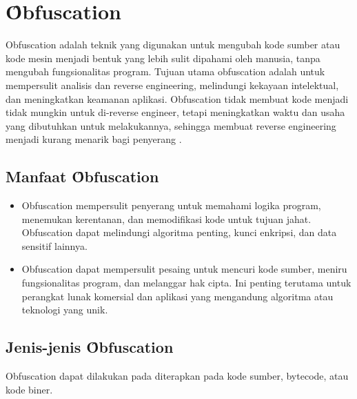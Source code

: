 \section{\f{Obfuscation}}
Obfuscation adalah teknik yang digunakan untuk mengubah kode sumber atau kode mesin menjadi bentuk yang lebih sulit dipahami oleh manusia, tanpa mengubah fungsionalitas program. Tujuan utama obfuscation adalah untuk mempersulit analisis dan reverse engineering, melindungi kekayaan intelektual, dan meningkatkan keamanan aplikasi. Obfuscation tidak membuat kode menjadi tidak mungkin untuk di-reverse engineer, tetapi meningkatkan waktu dan usaha yang dibutuhkan untuk melakukannya, sehingga membuat reverse engineering menjadi kurang menarik bagi penyerang \cite{Jin24}.

\subsection{Manfaat \f{Obfuscation}}
\begin{itemize}
	\item {} Obfuscation mempersulit penyerang untuk memahami logika program, menemukan kerentanan, dan memodifikasi kode untuk tujuan jahat. Obfuscation dapat melindungi algoritma penting, kunci enkripsi, dan data sensitif lainnya.
	\item {} Obfuscation dapat mempersulit pesaing untuk mencuri kode sumber, meniru fungsionalitas program, dan melanggar hak cipta. Ini penting terutama untuk perangkat lunak komersial dan aplikasi yang mengandung algoritma atau teknologi yang unik.
\end{itemize}

\subsection{Jenis-jenis \f{Obfuscation}}
Obfuscation dapat dilakukan pada diterapkan pada kode sumber, bytecode, atau kode biner.
